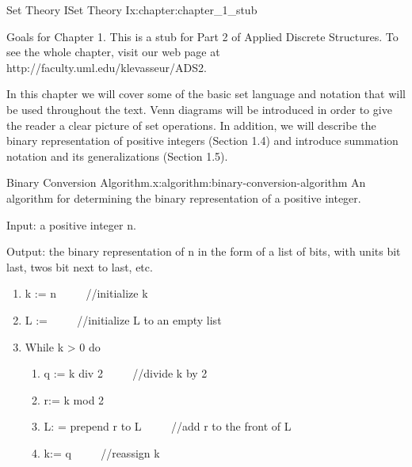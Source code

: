 \documentclass[twoside,10pt,]{book}
\numberwithin{equation}{section}
\begin{document}
\setcounter{tocdepth}{1}
\renewcommand*\contentsname{Contents}
\tableofcontents
\mainmatter
%
%
\typeout{************************************************}
\typeout{************************************************}
%
\begin{chapterptx}{Set Theory I}{}{Set Theory I}{}{}{x:chapter:chapter_1_stub}
\begin{introduction}{Goals for Chapter 1.}%
This is a stub for Part 2 of Applied Discrete Structures. To see the whole chapter, visit our web page at http:\slash{}\slash{}faculty.uml.edu\slash{}klevasseur\slash{}ADS2.%
\par
In this chapter we will cover some of the basic set language and notation that will be used throughout the text. Venn diagrams will be introduced in order to give the reader a clear picture of set operations. In addition, we will describe the binary representation of positive integers (Section 1.4) and introduce summation notation and its generalizations (Section 1.5).%
\end{introduction}%
\begin{algorithm}{Binary Conversion Algorithm.}{}{x:algorithm:binary-conversion-algorithm}%
%
An algorithm for determining the binary representation of a positive integer.%
\par
Input: a positive integer n.%
\par
Output: the binary representation of n in the form of a list of bits, with units bit last, twos bit next to last, etc.%
\par
%
\begin{enumerate}[label=(\arabic*)]
\item{}k := n \(\qquad  \)     \slash{}\slash{}initialize k%
\item{}L := \textbraceleft{} \textbraceright{} \(\qquad  \)   \slash{}\slash{}initialize L to an empty list%
\item{}While k \textgreater{} 0 do%
\par
%
\begin{enumerate}[label=(\alph*)]
\item{}q := k div 2		\(\qquad  \)	\slash{}\slash{}divide k by 2%
\item{}r:= k mod 2%
\item{}L: = prepend r to L \(\qquad  \) \slash{}\slash{}add r to the front of L%
\item{}k:= q   			\(\qquad  \)	\slash{}\slash{}reassign k%
\end{enumerate}
%
\end{enumerate}
%
\end{algorithm}
\end{chapterptx}
\end{document}
